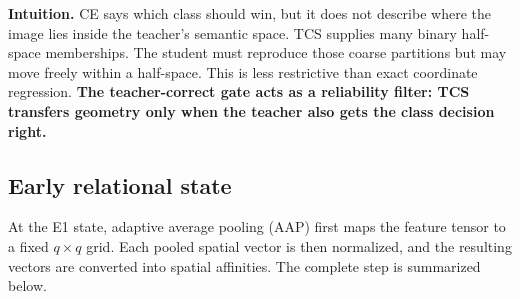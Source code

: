 \begin{center}
\end{center}

\textbf{Intuition.} CE says which class should win, but it does not describe
where the image lies inside the teacher's semantic space. TCS supplies many
binary half-space memberships. The student must reproduce those coarse
partitions but may move freely within a half-space. This is less restrictive
than exact coordinate regression. \textbf{The teacher-correct gate acts as a
reliability filter: TCS transfers geometry only when the teacher also gets the
class decision right.}

\subsection{Early relational state}

At the E1 state, adaptive average pooling (AAP) first maps the feature tensor to
a fixed $q\times q$ grid. Each pooled spatial vector is then normalized, and
the resulting vectors are converted into spatial affinities. The complete step
is summarized below.

\begin{center}
\end{center}

